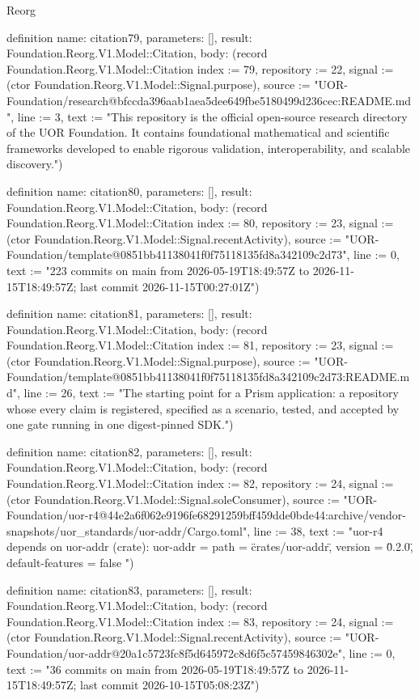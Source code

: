 \begin{lexlean}{Reorg}
\begin{semanticmodule}
definition{
  name: citation79,
  parameters: [],
  result: Foundation.Reorg.V1.Model::Citation,
  body: (record Foundation.Reorg.V1.Model::Citation {index := 79, repository := 22, signal := (ctor Foundation.Reorg.V1.Model::Signal.purpose), source := "UOR-Foundation/research@bfccda396aab1aea5dee649fbe5180499d236cec:README.md", line := 3, text := "This repository is the official open-source research directory of the UOR Foundation. It contains foundational mathematical and scientific frameworks developed to enable rigorous validation, interoperability, and scalable discovery."})
}

definition{
  name: citation80,
  parameters: [],
  result: Foundation.Reorg.V1.Model::Citation,
  body: (record Foundation.Reorg.V1.Model::Citation {index := 80, repository := 23, signal := (ctor Foundation.Reorg.V1.Model::Signal.recentActivity), source := "UOR-Foundation/template@0851bb41138041f0f75118135fd8a342109c2d73", line := 0, text := "223 commits on main from 2026-05-19T18:49:57Z to 2026-11-15T18:49:57Z; last commit 2026-11-15T00:27:01Z"})
}

definition{
  name: citation81,
  parameters: [],
  result: Foundation.Reorg.V1.Model::Citation,
  body: (record Foundation.Reorg.V1.Model::Citation {index := 81, repository := 23, signal := (ctor Foundation.Reorg.V1.Model::Signal.purpose), source := "UOR-Foundation/template@0851bb41138041f0f75118135fd8a342109c2d73:README.md", line := 26, text := "The starting point for a Prism application: a repository whose every claim is registered, specified as a scenario, tested, and accepted by one gate running in one digest-pinned SDK."})
}

definition{
  name: citation82,
  parameters: [],
  result: Foundation.Reorg.V1.Model::Citation,
  body: (record Foundation.Reorg.V1.Model::Citation {index := 82, repository := 24, signal := (ctor Foundation.Reorg.V1.Model::Signal.soleConsumer), source := "UOR-Foundation/uor-r4@44e2a6f062e9196fe68291259bff459dde0bde44:archive/vendor-snapshots/uor_standards/uor-addr/Cargo.toml", line := 38, text := "uor-r4 depends on uor-addr (crate): uor-addr      = { path = \"crates/uor-addr\",      version = \"0.2.0\", default-features = false }"})
}

definition{
  name: citation83,
  parameters: [],
  result: Foundation.Reorg.V1.Model::Citation,
  body: (record Foundation.Reorg.V1.Model::Citation {index := 83, repository := 24, signal := (ctor Foundation.Reorg.V1.Model::Signal.recentActivity), source := "UOR-Foundation/uor-addr@20a1c5723fc8f5d645972c8d6f5c57459846302e", line := 0, text := "36 commits on main from 2026-05-19T18:49:57Z to 2026-11-15T18:49:57Z; last commit 2026-10-15T05:08:23Z"})
}


\end{semanticmodule}
\end{lexlean}
